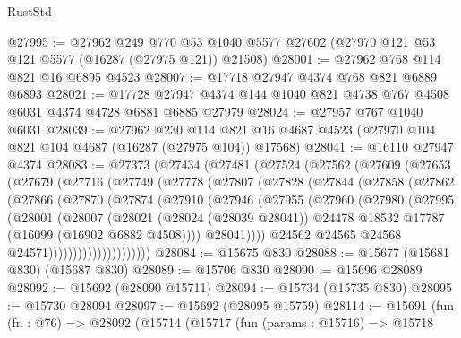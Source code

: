 \begin{lexlean}{RustStd}
\begin{coremodule}
@27995 := @27962
    @249
    @770
    @53
    @1040
    @5577
    @27602
    (@27970 @121 @53 @121 @5577 (@16287 (@27975 @121)) @21508)
@28001 := @27962 @768 @114 @821 @16 @6895 @4523
@28007 := @17718 @27947 @4374 @768 @821 @6889 @6893
@28021 := @17728 @27947 @4374 @144 @1040 @821 @4738 @767 @4508 @6031 @4374 @4728 @6881 @6885 @27979
@28024 := @27957 @767 @1040 @6031
@28039 := @27962
    @230
    @114
    @821
    @16
    @4687
    @4523
    (@27970 @104 @821 @104 @4687 (@16287 (@27975 @104)) @17568)
@28041 := @16110 @27947 @4374
@28083 := @27373
    (@27434
      (@27481
        (@27524
          (@27562
            (@27609
              (@27653
                (@27679
                  (@27716
                    (@27749
                      (@27778
                        (@27807
                          (@27828
                            (@27844
                              (@27858
                                (@27862
                                  (@27866
                                    (@27870
                                      (@27874
                                        (@27910
                                          (@27946
                                            (@27955
                                              (@27960
                                                (@27980
                                                  (@27995
                                                    (@28001
                                                      (@28007
                                                        (@28021
                                                          (@28024 (@28039 @28041))
                                                          @24478
                                                          @18532
                                                          @17787
                                                          (@16099 (@16902 @6882 @4508))))
                                                      @28041))))
                                              @24562
                                              @24565
                                              @24568
                                              @24571)))))))))))))))))))))
@28084 := @15675 @830
@28088 := @15677 (@15681 @830) (@15687 @830)
@28089 := @15706 @830
@28090 := @15696 @28089
@28092 := @15692 (@28090 @15711)
@28094 := @15734 (@15735 @830)
@28095 := @15730 @28094
@28097 := @15692 (@28095 @15759)
@28114 := @15691
    (fun (fn : @76) =>
    @28092
      (@15714
        (@15717
          (fun (params : @15716) =>
          @15718

\end{coremodule}
\end{lexlean}
